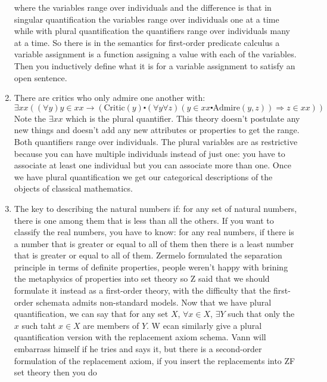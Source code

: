 \documentclass[12pt]{article}
\theoremstyle{definition}
\begin{document}
\begin{enumerate}
        where the variables range over individuals and the difference is that
        in singular quantification the variables range over individuals one at
        a time while with plural quantification the quantifiers range over
        individuals many at a time. So there is in the semantics for
        first-order predicate calculus a variable assignment is a function
        assigning a value with each of the variables. Then you inductively
        define what it is for a variable assignment to satisfy an open
        sentence. 
    \item
        There are critics who only admire one another with: $$\exists xx
        ((\forall y)y \in xx \rightarrow (\mathrm{Critic}(y) \centerdot
        (\forall y \forall z) (y \in xx \centerdot \mathrm{Admire}(y, z))
        \Rightarrow z \in xx))$$ Note the $\exists xx$ which is the plural
        quantifier. This theory doesn't postulate any new things and doesn't
        add any new attributes or properties to get the range. Both quantifiers
        range over individuals. The plural variables are as restrictive because
        you can have multiple individuals instead of just one: you have to
        associate at least one individual but you can associate more than one.
        Once we have plural quantification we get our categorical descriptions
        of the objects of classical mathematics. 
    \item
        The key to describing the natural numbers if: for any set of natural
        numbers, there is one among them that is less than all the others. If
        you want to classify the real numbers, you have to know: for any real
        numbers, if there is a number that is greater or equal to all of them
        then there is a least number that is greater or equal to all of them.
        Zermelo formulated the separation principle in terms of definite
        properties, people weren't happy with brining the metaphysics of
        properties into set theory so Z said that we should formulate it instead
        as a first-order theory, with the difficulty that the first-order
        schemata admits non-standard models. Now that we have plural
        quantification, we can say that for any set $X$, $\forall x \in X$,
        $\exists Y$ such that only the $x$ such taht $x \in X$ are members of
        $Y$. W ecan similarly give a plural quantification version with the
        replacement axiom schema. Vann will embarrass himself if he tries and
        says it, but there is a second-order formulation of the replacement
        axiom, if you insert the replacements into ZF set theory then you do

\end{enumerate}
\end{document}
